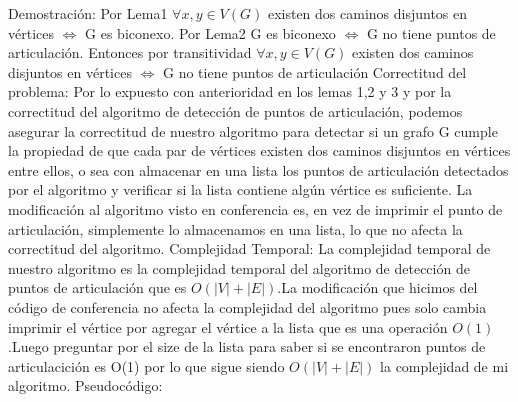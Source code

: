 \documentclass{article}
\begin{document}
    Demostraci\'on:\newline
    Por Lema1  $\forall x,y\in V(G)$ existen dos caminos disjuntos en v\'ertices $\Longleftrightarrow$ G es biconexo. 
    Por Lema2 G es biconexo $\Longleftrightarrow$ G no tiene puntos de articulaci\'on.
    Entonces por transitividad $\forall x,y\in V(G)$ existen dos caminos disjuntos en v\'ertices 
    $\Longleftrightarrow$ G no tiene puntos de articulaci\'on
    \newline
    \newline
    \newline
    Correctitud del problema:
    \newline
    Por lo expuesto con anterioridad en los lemas 1,2 y 3 y por la correctitud del algoritmo de detecci\'on de puntos de 
    articulaci\'on, podemos asegurar la correctitud de nuestro algoritmo para detectar si un grafo G cumple la propiedad 
    de que cada par de v\'ertices existen dos caminos disjuntos en v\'ertices entre ellos, o sea con almacenar en una lista
    los puntos de articulaci\'on detectados por el algoritmo y verificar si la lista contiene alg\'un v\'ertice es suficiente.
    La modificaci\'on al algoritmo visto en conferencia es, en vez de imprimir el punto de articulaci\'on, simplemente lo
    almacenamos en una lista, lo que no afecta la correctitud del algoritmo. 
    \newline
    \newline
    \newline
    Complejidad Temporal:\newline
    La complejidad temporal de nuestro algoritmo es la complejidad temporal del algoritmo de detecci\'on de puntos 
    de articulaci\'on que es $O(|V|+|E|)$.La modificaci\'on que hicimos del c\'odigo de conferencia no afecta la 
    complejidad del algoritmo pues solo cambia imprimir el v\'ertice por agregar el v\'ertice a la lista que es una
    operaci\'on $O(1)$.Luego preguntar por el size de la lista para saber si se encontraron puntos de articulacici\'on 
    es O(1) por lo que sigue siendo $O(|V|+|E|)$ la complejidad de mi algoritmo.
    \newline
    \newpage
    Pseudoc\'odigo:
    
\end{document}
